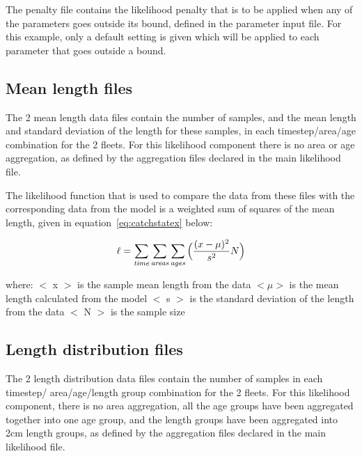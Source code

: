 \documentclass[10pt,titlepage]{article}
\begin{document}
The penalty file contains the likelihood penalty that is to be applied when any of the parameters goes outside its bound, defined in the parameter input file.  For this example, only a default setting is given which will be applied to each parameter that goes outside a bound.

{\small }

\subsection{Mean length files}

The 2 mean length data files contain the number of samples, and the mean length and standard deviation of the length for these samples, in each timestep/area/age combination for the 2 fleets.  For this likelihood component there is no area or age aggregation, as defined by the aggregation files declared in the main likelihood file.

\bigskip
The likelihood function that is used to compare the data from these files with the corresponding data from the model is a weighted sum of squares of the mean length, given in equation~\ref{eq:catchstatex} below:

\begin{equation}\label{eq:catchstatex}
\ell = \sum_{\it time}\sum_{\it areas}\sum_{\it ages} \Big(\frac{(x-\mu)^2} {s^2} N\Big)
\end{equation}

where:\newline
$<$ x $>$ is the sample mean length from the data\newline
$<\mu>$ is the mean length calculated from the model\newline
$<$ s $>$ is the standard deviation of the length from the data\newline
$<$ N $>$ is the sample size

{\small }
{\small }

\subsection{Length distribution files}

The 2 length distribution data files contain the number of samples in each timestep/ area/age/length group combination for the 2 fleets.  For this likelihood component, there is no area aggregation, all the age groups have been aggregated together into one age group, and the length groups have been aggregated into 2cm length groups, as defined by the aggregation files declared in the main likelihood file.
\end{document}
